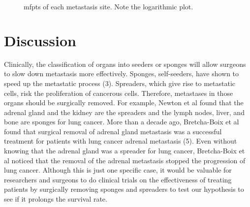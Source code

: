 \documentclass[letterpaper,12pt]{article}
\begin{document}
\begin{figure}[h!]
\centering
{}

\caption{mfpts of each metastasis site. Note the logarithmic plot.}
\end{figure}

\section{Discussion}

Clinically, the classification of organs into seeders or sponges will allow surgeons to slow down metastasis more effectively. Sponges, self-seeders, have shown to speed up the metastatic process (3). Spreaders, which give rise to metastatic cells, risk the proliferation of cancerous cells. Therefore, metastases in those organs should be surgically removed. For example, Newton et al found that the adrenal gland and the kidney are the spreaders and the lymph nodes, liver, and bone are sponges for lung cancer. More than a decade ago, Bretcha-Boix et al found that surgical removal of adrenal gland metastasis was a successful treatment for patients with lung cancer adrenal metastasis (5). Even without knowing that the adrenal gland was a spreader for lung cancer, Bretcha-Boix et al noticed that the removal of the adrenal metastasis stopped the progression of lung cancer. Although this is just one specific case, it would be valuable for researchers and surgeons to do clinical trials on the effectiveness of treating patients by surgically removing sponges and spreaders to test our hypothesis to see if it prolongs the survival rate.
\end{document}
